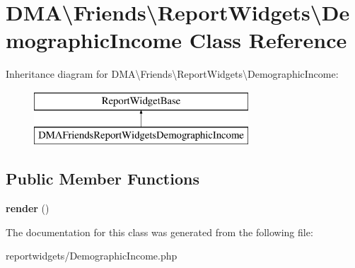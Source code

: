 \hypertarget{classDMA_1_1Friends_1_1ReportWidgets_1_1DemographicIncome}{}\section{D\+M\+A\textbackslash{}Friends\textbackslash{}Report\+Widgets\textbackslash{}Demographic\+Income Class Reference}
\label{classDMA_1_1Friends_1_1ReportWidgets_1_1DemographicIncome}
Inheritance diagram for D\+M\+A\textbackslash{}Friends\textbackslash{}Report\+Widgets\textbackslash{}Demographic\+Income\+:\begin{figure}[H]
\begin{center}
\leavevmode
\includegraphics[height=2.000000cm]{d4/d84/classDMA_1_1Friends_1_1ReportWidgets_1_1DemographicIncome}
\end{center}
\end{figure}
\subsection*{Public Member Functions}
\begin{DoxyCompactItemize}
\item 
\hypertarget{classDMA_1_1Friends_1_1ReportWidgets_1_1DemographicIncome_ab11277e3afd3cb4479257535822c6916}{}{\bfseries render} ()\label{classDMA_1_1Friends_1_1ReportWidgets_1_1DemographicIncome_ab11277e3afd3cb4479257535822c6916}

\end{DoxyCompactItemize}


The documentation for this class was generated from the following file\+:\begin{DoxyCompactItemize}
\item 
reportwidgets/Demographic\+Income.\+php\end{DoxyCompactItemize}
